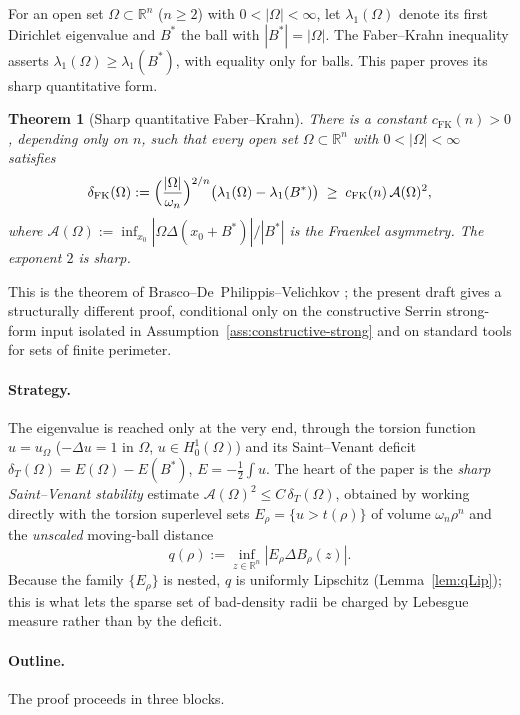 \documentclass[11pt]{amsart}
\newtheorem{theorem}{Theorem}[section]
\theoremstyle{definition}
\newcommand{\R}{\mathbb R}
\newcommand{\Om}{\Omega}
\newcommand{\Fr}{\mathcal A}
\newcommand{\dT}{\delta_T}
\newcommand{\Bstar}{B^*}
\newcommand{\deltaFK}{\delta_{\mathrm{FK}}}
\begin{document}
For an open set \(\Om\subset\R^n\) (\(n\ge2\)) with \(0<|\Om|<\infty\), let
\(\lambda_1(\Om)\) denote its first Dirichlet eigenvalue and \(\Bstar\) the ball
with \(|\Bstar|=|\Om|\).  The Faber--Krahn inequality asserts
\(\lambda_1(\Om)\ge\lambda_1(\Bstar)\), with equality only for balls.  This
paper proves its sharp quantitative form.

\begin{theorem}[Sharp quantitative Faber--Krahn]\label{thm:FK-main}
There is a constant \(c_{\mathrm{FK}}(n)>0\), depending only on \(n\), such that
every open set \(\Om\subset\R^n\) with \(0<|\Om|<\infty\) satisfies
\[
   \deltaFK(\Om):=
   \Bigl(\frac{|\Om|}{\omega_n}\Bigr)^{2/n}
   \bigl(\lambda_1(\Om)-\lambda_1(\Bstar)\bigr)
   \;\ge\; c_{\mathrm{FK}}(n)\,\Fr(\Om)^2,
\]
where \(\Fr(\Om):=\inf_{x_0}|\Om\Delta(x_0+\Bstar)|/|\Bstar|\) is the Fraenkel
asymmetry.  The exponent \(2\) is sharp.
\end{theorem}

This is the theorem of Brasco--De~Philippis--Velichkov \cite{BDV}; the present
draft gives a structurally different proof, conditional only on the constructive
Serrin strong-form input isolated in Assumption~\ref{ass:constructive-strong}
and on standard tools for sets of finite perimeter.

\paragraph{Strategy.} The eigenvalue is reached only at the very end, through
the torsion function \(u=u_\Om\) (\(-\Delta u=1\) in \(\Om\), \(u\in
H^1_0(\Om)\)) and its Saint--Venant deficit
\(\dT(\Om)=E(\Om)-E(\Bstar)\), \(E=-\tfrac12\int u\).  The heart of the paper is
the \emph{sharp Saint--Venant stability} estimate
\(\Fr(\Om)^2\le C\,\dT(\Om)\), obtained by working directly with the torsion
superlevel sets \(E_\rho=\{u>t(\rho)\}\) of volume \(\omega_n\rho^n\) and the
\emph{unscaled} moving-ball distance
\[
   q(\rho):=\inf_{z\in\R^n}|E_\rho\Delta B_\rho(z)| .
\]
Because the family \(\{E_\rho\}\) is nested, \(q\) is uniformly Lipschitz
(Lemma~\ref{lem:qLip}); this is what lets the sparse set of bad-density radii be
charged by Lebesgue measure rather than by the deficit.

\paragraph{Outline.} The proof proceeds in three blocks.
\end{document}
